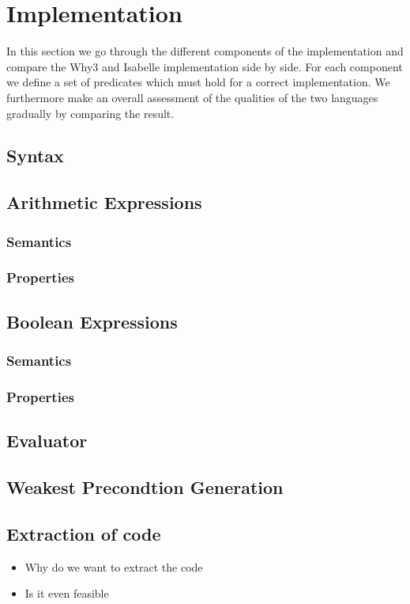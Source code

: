 \section{Implementation}
In this section we go through the different components of the implementation and compare the Why3 and Isabelle
implementation side by side.
For each component we define a set of predicates which must hold for a correct implementation.
We furthermore make an overall assessment of the qualities of the two languages gradually by comparing the result.

\subsection{Syntax}


\subsection{Arithmetic Expressions}

\subsubsection{Semantics}


\subsubsection{Properties}



\subsection{Boolean Expressions}

\subsubsection{Semantics}

\subsubsection{Properties}

\subsection{Evaluator}

\subsection{Weakest Precondtion Generation}

\subsection{Extraction of code}
\begin{itemize}
\item Why do we want to extract the code
  \item Is it even feasible
\end{itemize}